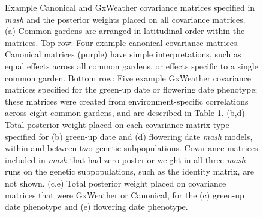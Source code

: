 \documentclass[
  9pt,
  twocolumn,
  twoside]{simple-article}%
\begin{document}
\begin{figure}


\caption{\label{fig-covar}Example Canonical and GxWeather covariance
matrices specified in \emph{mash} and the posterior weights placed on
all covariance matrices. (a) Common gardens are arranged in latitudinal
order within the matrices. Top row: Four example canonical covariance
matrices. Canonical matrices (purple) have simple interpretations, such
as equal effects across all common gardens, or effects specific to a
single common garden. Bottom row: Five example GxWeather covariance
matrices specified for the green-up date or flowering date phenotype;
these matrices were created from environment-specific correlations
across eight common gardens, and are described in Table 1. (b,d) Total
posterior weight placed on each covariance matrix type specified for (b)
green-up date and (d) flowering date \emph{mash} models, within and
between two genetic subpopulations. Covariance matrices included in
\emph{mash} that had zero posterior weight in all three \emph{mash} runs
on the genetic subpopulations, such as the identity matrix, are not
shown. (c,e) Total posterior weight placed on covariance matrices that
were GxWeather or Canonical, for the (c) green-up date phenotype and (e)
flowering date phenotype.}

\end{figure}%
\end{document}
